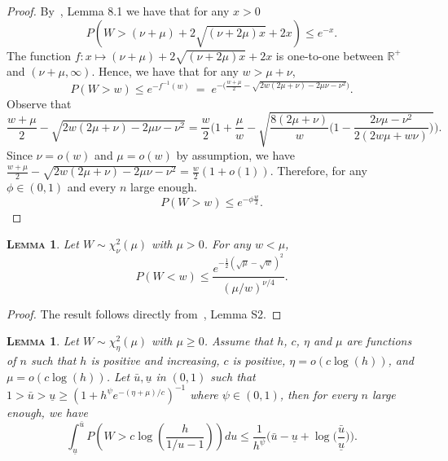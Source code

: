 \documentclass[
  12pt]{article}
\newcommand{\R}{\mathbb{R}}
\newtheorem{lem}[thm]{\textsc{Lemma}}
\begin{document}
\begin{proof}
By~\cite{birge}, Lemma 8.1 we have that for any $x>0$
$$P(W> (\nu+\mu)+2 \sqrt{(\nu+2 \mu) x}+2 x) \leq e^{-x}.$$
The function $f:x\mapsto (\nu+\mu)+2 \sqrt{(\nu+2 \mu) x}+2 x$ is  one-to-one between $\R^+$ and $( \nu+
\mu,\infty)$. 
Hence, we have that for any $w>\mu+\nu$,
$$P(W > w) \leq e^{-f^{-1}(w)} \:=\; e^{-\big(\frac{w+\mu}{2}  - \sqrt{2w(2 \mu+\nu)-2 \mu \nu - \nu^2 }\big) } .$$
Observe that
$$\frac{w+\mu}{2}  - \sqrt{2w( 2 \mu+ \nu)-2 \mu \nu - \nu^2 }= \frac{w}{2}\bigg(1+\frac{\mu}{w} -\sqrt{\frac{8(2 \mu+\nu)}{w}\bigg(1-\frac{2\nu\mu-\nu^2}{2(2w\mu+w\nu)} \bigg)}\bigg).$$
 Since $\nu=o(w)$ and $\mu=o(w)$ by assumption, we have $\frac{w+\mu}{2}  - \sqrt{2w( 2 \mu+ \nu)-2 \mu \nu - \nu^2 }= \frac{w}{2}(1+o(1))$. Therefore, for any $\phi\in(0,1)$ and every $n$ large enough.
$$P(W > w) \leq  e^{-\phi\frac{w}{2}}.$$
\end{proof}


\begin{lem}\label{lemma:s2} Let $W \sim \chi_\nu^2(\mu)$ with $\mu>0$. For any $w<\mu$, 
$$
P(W<w) \leq \frac{e^{-\frac{1}{2}(\sqrt{\mu}-\sqrt{w})^2}}{(\mu / w)^{\nu / 4}}.$$
\end{lem}

\begin{proof}
The result follows directly from~\cite{rossell2022concentration}, Lemma S2.
\end{proof}

\begin{lem}\label{lemma:s18} 
    Let $W\sim \chi_\eta^2(\mu)$ with $\mu \geq 0$. Assume that $h$, $c$, $\eta$ and $\mu$ are functions of $n$ such that $h$ is positive and increasing, $c$ is positive, $\eta=o(c\log(h))$, and $\mu=o(c\log(h))$. Let $\bar{u},\underline{u}$ in $(0,1)$ such that $1>\bar{u}>\underline{u}\geq\left(1+h^{\psi}e^{-(\eta+\mu)/c}\right)^{-1}$ where $\psi\in(0,1)$, then for every $n$ large enough, we have 
$$
\int_{\underline{u}}^{\bar{u}} P\left(W>c\log \left(\frac{h}{1 / u-1}\right)\right) d u \leq  \frac{1}{h^{\psi}}\Big(\bar{u}-\underline{u}+\log\Big(\frac{\bar{u}}{\underline{u}}\Big)\Big).
$$
\end{lem}
\end{document}

